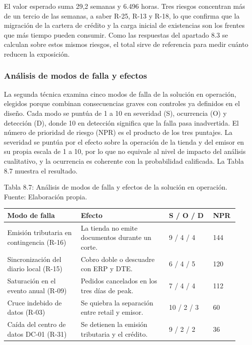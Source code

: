 \documentclass[11pt]{article}
\begin{document}
El valor esperado suma 29,2 semanas y 6.496 horas. Tres riesgos concentran más de un tercio de las semanas, a saber R-25, R-13 y R-18, lo que confirma que la migración de la cartera de crédito y la carga inicial de existencias son los frentes que más tiempo pueden consumir. Como las respuestas del apartado 8.3 se calculan sobre estos mismos riesgos, el total sirve de referencia para medir cuánto reducen la exposición.

\subsubsection{Análisis de modos de falla y efectos}

La segunda técnica examina cinco modos de falla de la solución en operación, elegidos porque combinan consecuencias graves con controles ya definidos en el diseño. Cada modo se puntúa de 1 a 10 en severidad (S), ocurrencia (O) y detección (D), donde 10 en detección significa que la falla pasa inadvertida. El número de prioridad de riesgo (NPR) es el producto de los tres puntajes. La severidad se puntúa por el efecto sobre la operación de la tienda y del emisor en su propia escala de 1 a 10, por lo que no equivale al nivel de impacto del análisis cualitativo, y la ocurrencia es coherente con la probabilidad calificada. La Tabla 8.7 muestra el resultado.

Tabla 8.7: Análisis de modos de falla y efectos de la solución en operación. Fuente: Elaboración propia.

\begin{longtable}{p{0.30\linewidth}p{0.36\linewidth}p{0.18\linewidth}p{0.10\linewidth}}
\toprule
\textbf{Modo de falla} & \textbf{Efecto} & \textbf{S / O / D} & \textbf{NPR} \\
\midrule
\endhead
\bottomrule
\endlastfoot
Emisión tributaria en contingencia (R-16) & La tienda no emite documentos durante un corte. & 9 / 4 / 4 & 144 \\
Sincronización del diario local (R-15) & Cobro doble o descuadre con ERP y DTE. & 6 / 4 / 5 & 120 \\
Saturación en el evento anual (R-09) & Pedidos cancelados en los tres días de peak. & 7 / 4 / 4 & 112 \\
Cruce indebido de datos (R-03) & Se quiebra la separación entre retail y emisor. & 10 / 2 / 3 & 60 \\
Caída del centro de datos DC-01 (R-31) & Se detienen la emisión tributaria y el crédito. & 9 / 2 / 2 & 36 \\
\end{longtable}
\end{document}
